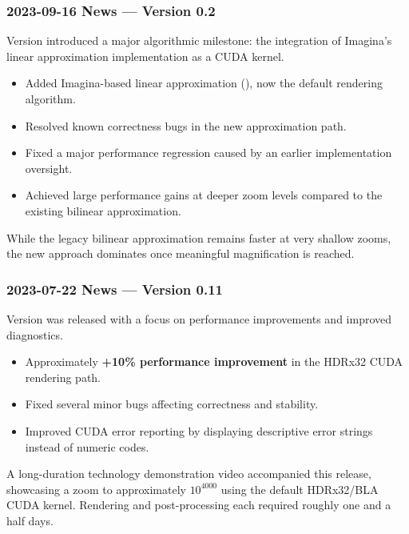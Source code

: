 \subsubsection{2023-09-16 News --- Version 0.2}

Version  introduced a major algorithmic milestone: the integration
of Imagina's linear approximation implementation as a CUDA kernel.

\begin{itemize}
  \item Added Imagina-based linear approximation (), now the
  default rendering algorithm.
  \item Resolved known correctness bugs in the new approximation path.
  \item Fixed a major performance regression caused by an earlier implementation oversight.
  \item Achieved large performance gains at deeper zoom levels compared to the
  existing bilinear approximation.
\end{itemize}

While the legacy bilinear approximation remains faster at very shallow zooms,
the new approach dominates once meaningful magnification is reached.


\subsubsection{2023-07-22 News --- Version 0.11}

Version  was released with a focus on performance improvements and
improved diagnostics.

\begin{itemize}
  \item Approximately \textbf{+10\% performance improvement} in the HDRx32 CUDA
  rendering path.
  \item Fixed several minor bugs affecting correctness and stability.
  \item Improved CUDA error reporting by displaying descriptive error strings
  instead of numeric codes.
\end{itemize}

A long-duration technology demonstration video accompanied this release,
showcasing a zoom to approximately $10^{4000}$ using the default HDRx32/BLA CUDA
kernel.  Rendering and post-processing each required roughly one and a half
days.

